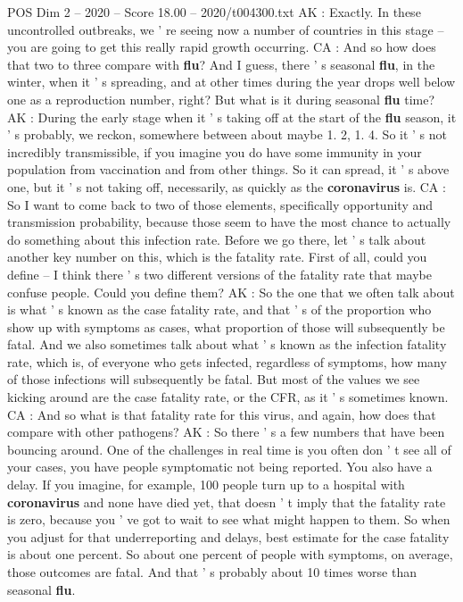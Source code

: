 \begin{textsample}{POS Dim 2 – 2020 – Score 18.00 – 2020/t004300.txt}
AK : Exactly.
In these uncontrolled outbreaks, we ' re seeing now a number of countries in this stage -- you are going to get this really rapid growth occurring.
CA : And so how does that two to three compare with \textbf{flu}?
And I guess, there ' s seasonal \textbf{flu}, in the winter, when it ' s spreading, and at other times during the year drops well below one as a reproduction number, right?
But what is it during seasonal \textbf{flu} time?
AK : During the early stage when it ' s taking off at the start of the \textbf{flu} season, it ' s probably, we reckon, somewhere between about maybe 1. 2, 1. 4.
So it ' s not incredibly transmissible, if you imagine you do have some immunity in your population from vaccination and from other things.
So it can spread, it ' s above one, but it ' s not taking off, necessarily, as quickly as the \textbf{coronavirus} is.
CA : So I want to come back to two of those elements, specifically opportunity and transmission probability, because those seem to have the most chance to actually do something about this infection rate.
Before we go there, let ' s talk about another key number on this, which is the fatality rate.
First of all, could you define -- I think there ' s two different versions of the fatality rate that maybe confuse people.
Could you define them?
AK : So the one that we often talk about is what ' s known as the case fatality rate, and that ' s of the proportion who show up with symptoms as cases, what proportion of those will subsequently be fatal.
And we also sometimes talk about what ' s known as the infection fatality rate, which is, of everyone who gets infected, regardless of symptoms, how many of those infections will subsequently be fatal.
But most of the values we see kicking around are the case fatality rate, or the CFR, as it ' s sometimes known.
CA : And so what is that fatality rate for this virus, and again, how does that compare with other pathogens?
AK : So there ' s a few numbers that have been bouncing around.
One of the challenges in real time is you often don ' t see all of your cases, you have people symptomatic not being reported.
You also have a delay.
If you imagine, for example, 100 people turn up to a hospital with \textbf{coronavirus} and none have died yet, that doesn ' t imply that the fatality rate is zero, because you ' ve got to wait to see what might happen to them.
So when you adjust for that underreporting and delays, best estimate for the case fatality is about one percent.
So about one percent of people with symptoms, on average, those outcomes are fatal.
And that ' s probably about 10 times worse than seasonal \textbf{flu}.

\end{textsample}
